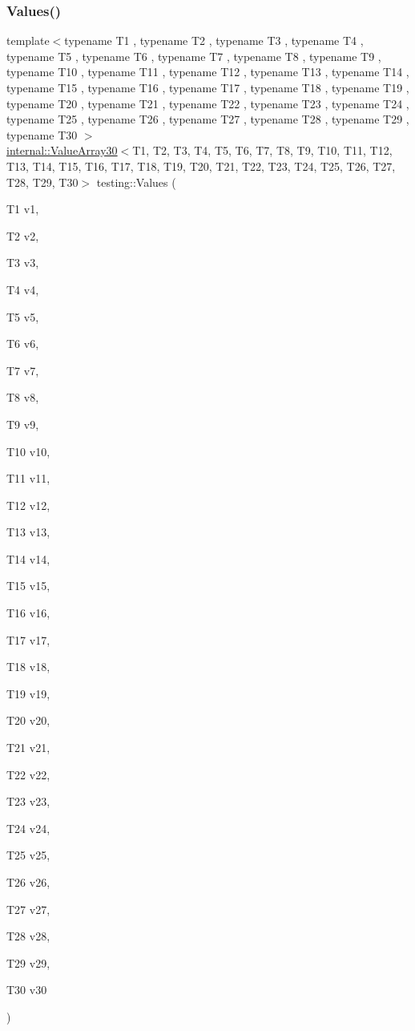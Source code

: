 \mbox{\label{namespacetesting_a016767be70ad0412bdbf837bc4d3ca98}} 
\subsubsection{\texorpdfstring{Values()}{Values()}\hspace{0.1cm}{\footnotesize\ttfamily [30/50]}}
{\footnotesize\ttfamily template$<$typename T1 , typename T2 , typename T3 , typename T4 , typename T5 , typename T6 , typename T7 , typename T8 , typename T9 , typename T10 , typename T11 , typename T12 , typename T13 , typename T14 , typename T15 , typename T16 , typename T17 , typename T18 , typename T19 , typename T20 , typename T21 , typename T22 , typename T23 , typename T24 , typename T25 , typename T26 , typename T27 , typename T28 , typename T29 , typename T30 $>$ \\
\mbox{\hyperlink{classtesting_1_1internal_1_1ValueArray30}{internal\+::\+Value\+Array30}}$<$T1, T2, T3, T4, T5, T6, T7, T8, T9, T10, T11, T12, T13, T14, T15, T16, T17, T18, T19, T20, T21, T22, T23, T24, T25, T26, T27, T28, T29, T30$>$ testing\+::\+Values (\begin{DoxyParamCaption}\item[{T1}]{v1,  }\item[{T2}]{v2,  }\item[{T3}]{v3,  }\item[{T4}]{v4,  }\item[{T5}]{v5,  }\item[{T6}]{v6,  }\item[{T7}]{v7,  }\item[{T8}]{v8,  }\item[{T9}]{v9,  }\item[{T10}]{v10,  }\item[{T11}]{v11,  }\item[{T12}]{v12,  }\item[{T13}]{v13,  }\item[{T14}]{v14,  }\item[{T15}]{v15,  }\item[{T16}]{v16,  }\item[{T17}]{v17,  }\item[{T18}]{v18,  }\item[{T19}]{v19,  }\item[{T20}]{v20,  }\item[{T21}]{v21,  }\item[{T22}]{v22,  }\item[{T23}]{v23,  }\item[{T24}]{v24,  }\item[{T25}]{v25,  }\item[{T26}]{v26,  }\item[{T27}]{v27,  }\item[{T28}]{v28,  }\item[{T29}]{v29,  }\item[{T30}]{v30 }\end{DoxyParamCaption})}


